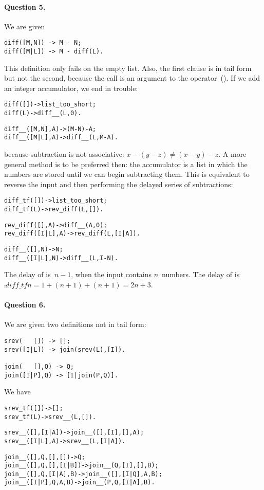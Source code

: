 \medskip

\paragraph{Question 5.}

We are given
\begin{verbatim}
diff([M,N]) -> M - N;
diff([M|L]) -> M - diff(L).
\end{verbatim}
This definition only fails on the empty list. Also, the first clause
is in tail form but not the second, because the call 
is an argument to the operator~(\erlcode{-}). If we add an integer
accumulator, we end in trouble:
\begin{alltt}
diff([]) -> list_too_short;
diff( L) -> diff__(L,0).

diff__([M,N],A) -> (M-N)-A;\hfill% \emph{Wrong}
diff__([M|L],A) -> diff__(L,M-A).\hfill% \emph{Wrong}
\end{alltt}
because subtraction is not associative: \(x-(y-z) \neq (x-y)-z\). A
more general method is to be preferred then: the accumulator is a list
in which the numbers are stored until we can begin subtracting
them. This is equivalent to reverse the input and then performing the
delayed series of subtractions:
\begin{alltt}
diff_tf([]) -> list_too_short;
diff_tf( L) -> rev_diff(L,[]).

rev_diff(   [],A) -> diff__(A,0);\hfill% \emph{Prepare to subtract}
rev_diff([I|L],A) -> rev_diff(L,[I|A]).\hfill% \emph{Reversal}

diff__(   [],N) -> N;
diff__([I|L],N) -> diff__(L,I-N).
\end{alltt}
The delay of  is~\(n-1\), when the input contains
\(n\)~numbers. The delay of  is
\(\comp{diff\_tf}{n} = 1 + (n+1) + (n+1) = 2n + 3\).

\medskip

\paragraph{Question 6.}

We are given two definitions not in tail form:
\begin{verbatim}
srev(   []) -> [];
srev([I|L]) -> join(srev(L),[I]).

join(   [],Q) -> Q;
join([I|P],Q) -> [I|join(P,Q)].
\end{verbatim}
We have
\begin{alltt}
srev_tf([]) -> [];
srev_tf( L) -> srev__(L,[]).

srev__(   [],[I|A]) -> join__([],[I],[],A);
srev__([I|L],    A) -> srev__(L,[I|A]).

join__(   [],Q,   [],   []) -> Q;
join__(   [],Q,   [],[I|B]) -> join__(Q,[I],[],B);
join__(   [],Q,[I|A],    B) -> join__([],[I|Q],A,B);
join__([I|P],Q,    A,    B) -> join__(P,Q,[I|A],B).
\end{alltt}


